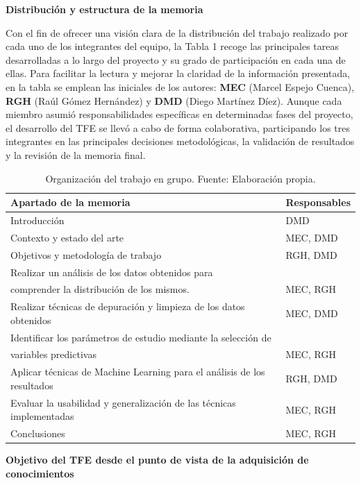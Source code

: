\documentclass[
]{article}
\begin{document}
	
	\textbf{Distribución y estructura de la memoria}
	
	Con el fin de ofrecer una visión clara de la distribución del trabajo realizado por cada uno de los integrantes del equipo, la Tabla 1 recoge las principales tareas desarrolladas a lo largo del proyecto y su grado de participación en cada una de ellas. Para facilitar la lectura y mejorar la claridad de la información presentada, en la tabla se emplean las iniciales de los autores: \textbf{MEC} (Marcel Espejo Cuenca), \textbf{RGH} (Raúl Gómez Hernández) y \textbf{DMD} (Diego Martínez Díez). Aunque cada miembro asumió responsabilidades específicas en determinadas fases del proyecto, el desarrollo del TFE se llevó a cabo de forma colaborativa, participando los tres integrantes en las principales decisiones metodológicas, la validación de resultados y la revisión de la memoria final.
	
	
	\begin{table}[H]
		\centering
		\label{tab:organizacion_grupo}
		\begin{tabular}{ll}
			\toprule
			\textbf{Apartado de la memoria} & \textbf{Responsables} \\ \midrule
			Introducción & DMD \\
			Contexto y estado del arte & MEC, DMD  \\
			Objetivos y metodología de trabajo &  RGH, DMD \\
			Realizar un análisis de los datos obtenidos para & \\
			comprender la distribución de los mismos. & MEC, RGH \\
			Realizar técnicas de depuración y limpieza de los datos obtenidos & MEC, DMD \\
			Identificar los parámetros de estudio mediante la selección de & \\
			variables predictivas & MEC, RGH \\
			Aplicar técnicas de Machine Learning para el análisis de los resultados &  RGH, DMD \\
			Evaluar la usabilidad y generalización de las técnicas implementadas & MEC, RGH \\
			Conclusiones & MEC, RGH \\ \bottomrule
		\end{tabular}
	\caption{Organización del trabajo en grupo. Fuente: Elaboración propia.}
	\end{table}

\textbf{Objetivo del TFE desde el punto de vista de la adquisición de conocimientos}
\end{document}

